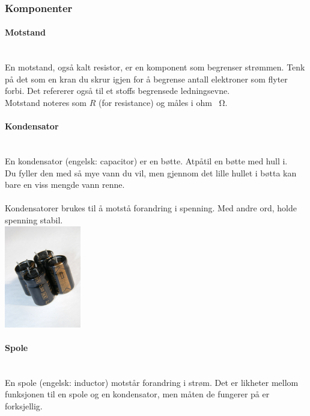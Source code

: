 \subsubsection{Komponenter}
\paragraph{Motstand} \mbox{} \\
En motstand, også kalt resistor, er en komponent som begrenser strømmen.
Tenk på det som en kran du skrur igjen for å begrense antall elektroner som flyter forbi.
Det refererer også til et stoffs begrensede ledningsevne.
\\
Motstand noteres som $R$ (for resistance) og måles i ohm \SI{}{\ohm}.

\paragraph{Kondensator} \mbox{} \\
En kondensator (engelsk: capacitor) er en bøtte. Atpåtil en bøtte med hull i.
\\
Du fyller den med så mye vann du vil, men gjennom det lille hullet i bøtta kan bare en viss mengde vann renne.
\\\\
Kondensatorer brukes til å motstå forandring i spenning.
Med andre ord, holde spenning stabil.
\\
\includegraphics[width=0.25\textwidth]{./img/kondensator}

\paragraph{Spole} \mbox{} \\
En spole (engelsk: inductor) motstår forandring i strøm.
Det er likheter mellom funksjonen til en spole og en kondensator, men måten de fungerer på er forksjellig.
